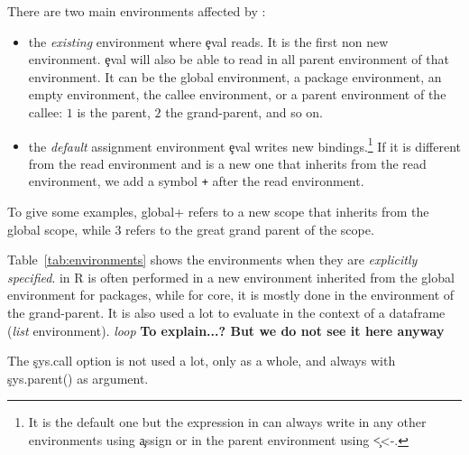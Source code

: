 \documentclass[conference]{IEEEtran}
\begin{document}
There are two main environments affected by \eval:
\begin{itemize}
	\item the \emph{existing} environment where \c{eval} reads. It is the first non new environment. \c{eval} will also be able to read in all parent environment of that environment. It can be the global environment, a package environment, an empty environment, the callee environment, or a parent environment of the callee: $1$ is the parent, $2$ the grand-parent, and so on.
	\item the \emph{default} assignment environment \c{eval} writes new bindings.\footnote{It is the default one but the expression in \eval can always write in any other environments using \c{assign} or in the parent environment using \c{<<-}.} If it is different from the read environment and is a new one that inherits from the read environment, we add a symbol \texttt{+} after the read environment.
\end{itemize}

To give some examples,  global+ refers to a new scope that inherits from the global scope, while 3 refers to the great grand parent of the \eval scope.

Table~\ref{tab:environments} shows the environments when they are \emph{explicitly specified}. \eval in R is often performed in a new environment inherited from the global environment for packages, while for core, it is mostly done in the environment of the grand-parent.  It is also used a lot to evaluate in the context of a dataframe (\emph{list} environment). \emph{loop} \textbf{To explain...? But we do not see it here anyway}

The \c{sys.call} option is not used a lot, only \SysCallEnvirPercent as a whole, and always with \c{sys.parent()} as argument.

\end{document}
